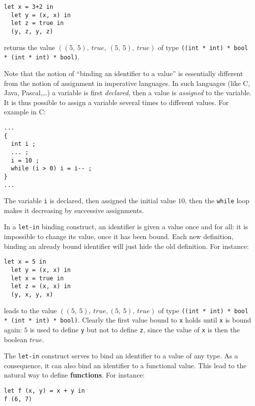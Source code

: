 {\scriptsize
\begin{lstlisting}
let x = 3+2 in
  let y = (x, x) in
  let z = true in
  (y, z, y, z)
\end{lstlisting}}

\noindent returns the value $((5,\ 5),\ true,\ (5,\ 5),\ true)$ of type
{\tt ((int * int) * bool * (int * int) * bool)}.



\medskip
{}
Note that the notion of ``binding an identifier to a value'' is
essentially different from the
notion of assignment in imperative languages. In such languages (like
C, Java, Pascal,\ldots) a variable is first {\em declared}, then a value is
{\em assigned} to the variable. It is thus possible to assign a variable
several times to different values. For example in C:

{\scriptsize
\begin{lstlisting}
...
{
  int i ;
  ... ;
  i = 10 ;
  while (i > 0) i = i-- ;
}
...
\end{lstlisting}}

The variable {\tt i} is declared, then assigned the initial value
$10$, then the {\tt while} loop makes it decreasing by successive
assignments.

In a {\tt let-in} binding construct, an identifier is given a value
once and for all: it is impossible to change its  value, once it
has been bound.
Each new definition, binding an already bound identifier will just hide the
old definition. For instance:

{\scriptsize
\begin{lstlisting}
let x = 5 in
  let y = (x, x) in
  let x = true in
  let z = (x, x) in
  (y, x, y, x)
\end{lstlisting}}

\noindent leads to the value $((5,\ 5),\ true, (5,\ 5),\ true)$
of type {\tt ((int * int) * bool * (int * int) * bool)}. Clearly the
first value bound to {\tt x}  holds until {\tt x}
is bound again: $5$ is used to define {\tt y} but not to define
{\tt z}, since the value of {\tt x} is then the boolean $true$.

\medskip

The {\tt let-in} construct serves to bind an identifier to a value of
any type.  As a consequence, it can also bind an identifier to a
functional value.  This lead to the natural way to define {\bf
  functions}. For instance:

 {\scriptsize
\begin{lstlisting}
let f (x, y) = x + y in
f (6, 7)
\end{lstlisting}}

